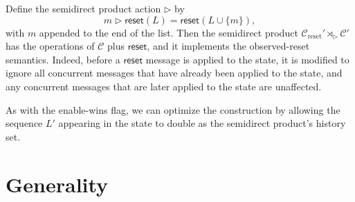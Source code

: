 \documentclass[acmsmall,nonacm,12pt]{acmart}
\newcommand{\mc}[1]{\ensuremath{\mathcal{#1}}}
\newcommand{\msf}[1]{\ensuremath{\mathsf{#1}}}
\newcommand{\act}{\triangleright}
\theoremstyle{plain}
\newtheorem{myprop}[mythm]{Proposition}
\theoremstyle{definition}
\begin{document}
Define the semidirect product action $\act$ by
\[
m \act \msf{reset}(L) = \msf{reset}(L \cup \{m\}),
\]
with $m$ appended to the end of the list.  Then the semidirect product $\mc{C}_{\text{reset}}' \rtimes_\act \mc{C}'$ has the operations of $\mc{C}$ plus $\msf{reset}$, and it implements the observed-reset semantics.  Indeed, before a $\msf{reset}$ message is applied to the state, it is modified to ignore all concurrent messages that have already been applied to the state, and any concurrent messages that are later applied to the state are unaffected.

As with the enable-wins flag, we can optimize the construction by allowing the sequence $L'$ appearing in the state to double as the semidirect product's history set.








\section{Generality}
\end{document}
